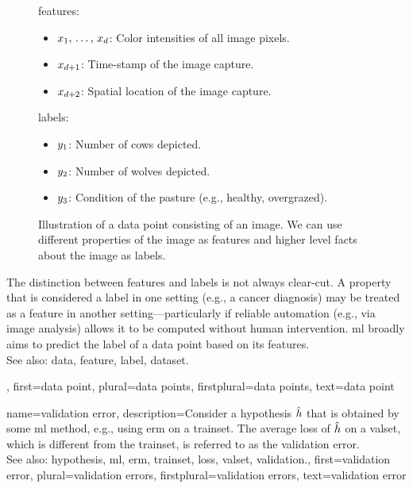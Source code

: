 {{\begin{figure}[H]
\begin{minipage}[t]{0.95\textwidth}
        			\Glspl{feature}:
        			\begin{itemize}
            			\item $x_{1}, \,\ldots, \,x_{d}$: Color intensities of all image pixels.
            			\item $x_{d+1}$: Time-stamp of the image capture.
            			\item $x_{d+2}$: Spatial location of the image capture.
			\end{itemize}
			\Glspl{label}:
            		\begin{itemize}
               	 		\item $y_{1}$: Number of cows depicted. 
                			\item $y_{2}$: Number of wolves depicted. 
                			\item $y_{3}$: Condition of the pasture (e.g., healthy, overgrazed).
            		\end{itemize}
    			\end{minipage}
    		\caption{Illustration of a \gls{data} point consisting of an image. We can use 
			different properties of the image as \glspl{feature} and higher level facts
			about the image as \glspl{label}.\label{fig:datapoint_cowherd_dict}}
		\end{figure}
 		The distinction between \glspl{feature} and \glspl{label} is not always clear-cut. 
 		A property that is considered a \gls{label} in one setting (e.g., a cancer diagnosis) 
 		may be treated as a \gls{feature} in another setting—particularly if reliable automation (e.g., 
 		via image analysis) allows it to be computed without human intervention.
   		\Gls{ml} broadly aims to predict the \gls{label} of a \gls{data} point based on its \glspl{feature}. 
				\\
		See also: \gls{data}, \gls{feature}, \gls{label}, \gls{dataset}.}, 
	first={data point},
	plural={data points},
	firstplural={data points},
	text={data point}  
}

{name={validation error},
 	description={Consider a \gls{hypothesis} $\hat{h}$ that is 
 		obtained by some \gls{ml} method, e.g., using \gls{erm} on a \gls{trainset}. The average \gls{loss} 
 		of $\hat{h}$ on a \gls{valset}, which is different from the \gls{trainset}, is referred 
 		to as the \gls{validation} error.
			\\
		See also: \gls{hypothesis}, \gls{ml}, \gls{erm}, \gls{trainset}, \gls{loss}, \gls{valset}, \gls{validation}.},
	first={validation error},
	plural={validation errors},
	firstplural={validation errors},
	text={validation error}  
}

